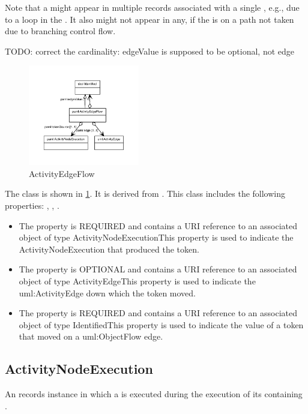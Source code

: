         Note that a  might appear in multiple  records associated with a single
        , e.g., due to a loop in the .  It also might not appear in any, if the
         is on a path not taken due to branching control flow.

        TODO: correct the cardinality: edgeValue is supposed to be optional, not edge
\newline%
\linebreak%


\begin{figure}[h!]%
\centering%
\includegraphics[width=0.4319148936170213\textwidth]{labop_classes/ActivityEdgeFlow_abstraction_hierarchy.pdf}%
\caption{ActivityEdgeFlow}%
\label{fig:ActivityEdgeFlow}%
\end{figure}

%
The  class is shown in \ref{fig:ActivityEdgeFlow}. It is derived from .%
This class includes the following properties: , , . %
\begin{itemize}%
\item%
The  property is REQUIRED and contains a URI reference to an associated object of type ActivityNodeExecutionThis property is used to indicate the ActivityNodeExecution that produced the token.%
\item%
The  property is OPTIONAL and contains a URI reference to an associated object of type ActivityEdgeThis property is used to indicate the uml:ActivityEdge down which the token moved.%
\item%
The  property is REQUIRED and contains a URI reference to an associated object of type IdentifiedThis property is used to indicate the value of a token that moved on a uml:ObjectFlow edge.%
\end{itemize}%
\subsection{ActivityNodeExecution}%
\label{sec:labop:ActivityNodeExecution}%
An  records  instance in which a  is executed during the
        execution of its containing .

